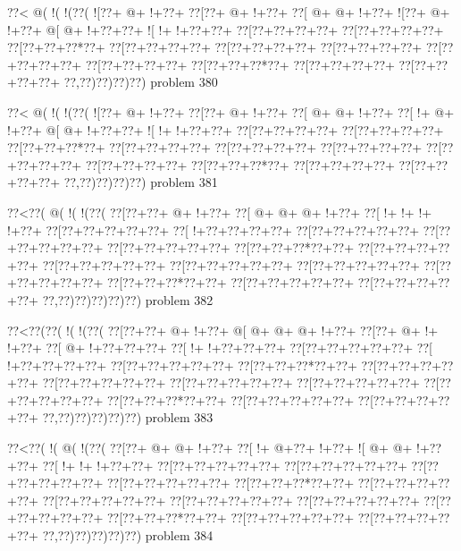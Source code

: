 \vbox{\vbox{\goo
\0??<\- @(\- !(\- !(\0??(
\- ![\0??+\- @+\- !+\0??+
\0??[\0??+\- @+\- !+\0??+
\0??[\- @+\- @+\- !+\0??+
\- ![\0??+\- @+\- !+\0??+
\- @[\- @+\- !+\0??+\0??+
\- ![\- !+\- !+\0??+\0??+
\0??[\0??+\0??+\0??+\0??+
\0??[\0??+\0??+\0??+\0??+
\0??[\0??+\0??+\0??*\0??+
\0??[\0??+\0??+\0??+\0??+
\0??[\0??+\0??+\0??+\0??+
\0??[\0??+\0??+\0??+\0??+
\0??[\0??+\0??+\0??+\0??+
\0??[\0??+\0??+\0??+\0??+
\0??[\0??+\0??+\0??*\0??+
\0??[\0??+\0??+\0??+\0??+
\0??[\0??+\0??+\0??+\0??+
\0??,\0??)\0??)\0??)\0??)
}
\hfil problem 380\hfil\break
}

\vbox{\vbox{\goo
\0??<\- @(\- !(\- !(\0??(
\- ![\0??+\- @+\- !+\0??+
\0??[\0??+\- @+\- !+\0??+
\0??[\- @+\- @+\- !+\0??+
\0??[\- !+\- @+\- !+\0??+
\- @[\- @+\- !+\0??+\0??+
\- ![\- !+\- !+\0??+\0??+
\0??[\0??+\0??+\0??+\0??+
\0??[\0??+\0??+\0??+\0??+
\0??[\0??+\0??+\0??*\0??+
\0??[\0??+\0??+\0??+\0??+
\0??[\0??+\0??+\0??+\0??+
\0??[\0??+\0??+\0??+\0??+
\0??[\0??+\0??+\0??+\0??+
\0??[\0??+\0??+\0??+\0??+
\0??[\0??+\0??+\0??*\0??+
\0??[\0??+\0??+\0??+\0??+
\0??[\0??+\0??+\0??+\0??+
\0??,\0??)\0??)\0??)\0??)
}
\hfil problem 381\hfil\break
}

\vbox{\vbox{\goo
\0??<\0??(\- @(\- !(\- !(\0??(
\0??[\0??+\0??+\- @+\- !+\0??+
\0??[\- @+\- @+\- @+\- !+\0??+
\0??[\- !+\- !+\- !+\- !+\0??+
\0??[\0??+\0??+\0??+\0??+\0??+
\0??[\- !+\0??+\0??+\0??+\0??+
\0??[\0??+\0??+\0??+\0??+\0??+
\0??[\0??+\0??+\0??+\0??+\0??+
\0??[\0??+\0??+\0??+\0??+\0??+
\0??[\0??+\0??+\0??*\0??+\0??+
\0??[\0??+\0??+\0??+\0??+\0??+
\0??[\0??+\0??+\0??+\0??+\0??+
\0??[\0??+\0??+\0??+\0??+\0??+
\0??[\0??+\0??+\0??+\0??+\0??+
\0??[\0??+\0??+\0??+\0??+\0??+
\0??[\0??+\0??+\0??*\0??+\0??+
\0??[\0??+\0??+\0??+\0??+\0??+
\0??[\0??+\0??+\0??+\0??+\0??+
\0??,\0??)\0??)\0??)\0??)\0??)
}
\hfil problem 382\hfil\break
}

\vbox{\vbox{\goo
\0??<\0??(\0??(\- !(\- !(\0??(
\0??[\0??+\0??+\- @+\- !+\0??+
\- @[\- @+\- @+\- @+\- !+\0??+
\0??[\0??+\- @+\- !+\- !+\0??+
\0??[\- @+\- !+\0??+\0??+\0??+
\0??[\- !+\- !+\0??+\0??+\0??+
\0??[\0??+\0??+\0??+\0??+\0??+
\0??[\- !+\0??+\0??+\0??+\0??+
\0??[\0??+\0??+\0??+\0??+\0??+
\0??[\0??+\0??+\0??*\0??+\0??+
\0??[\0??+\0??+\0??+\0??+\0??+
\0??[\0??+\0??+\0??+\0??+\0??+
\0??[\0??+\0??+\0??+\0??+\0??+
\0??[\0??+\0??+\0??+\0??+\0??+
\0??[\0??+\0??+\0??+\0??+\0??+
\0??[\0??+\0??+\0??*\0??+\0??+
\0??[\0??+\0??+\0??+\0??+\0??+
\0??[\0??+\0??+\0??+\0??+\0??+
\0??,\0??)\0??)\0??)\0??)\0??)
}
\hfil problem 383\hfil\break
}

\vbox{\vbox{\goo
\0??<\0??(\- !(\- @(\- !(\0??(
\0??[\0??+\- @+\- @+\- !+\0??+
\0??[\- !+\- @+\0??+\- !+\0??+
\- ![\- @+\- @+\- !+\0??+\0??+
\0??[\- !+\- !+\- !+\0??+\0??+
\0??[\0??+\0??+\0??+\0??+\0??+
\0??[\0??+\0??+\0??+\0??+\0??+
\0??[\0??+\0??+\0??+\0??+\0??+
\0??[\0??+\0??+\0??+\0??+\0??+
\0??[\0??+\0??+\0??*\0??+\0??+
\0??[\0??+\0??+\0??+\0??+\0??+
\0??[\0??+\0??+\0??+\0??+\0??+
\0??[\0??+\0??+\0??+\0??+\0??+
\0??[\0??+\0??+\0??+\0??+\0??+
\0??[\0??+\0??+\0??+\0??+\0??+
\0??[\0??+\0??+\0??*\0??+\0??+
\0??[\0??+\0??+\0??+\0??+\0??+
\0??[\0??+\0??+\0??+\0??+\0??+
\0??,\0??)\0??)\0??)\0??)\0??)
}
\hfil problem 384\hfil\break
}

